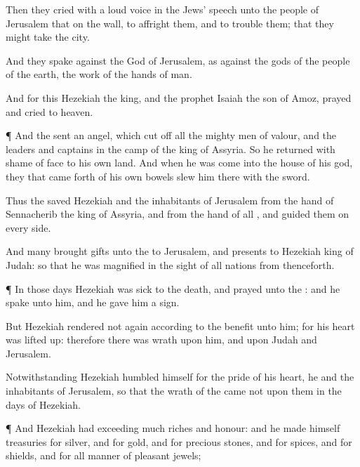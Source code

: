 {Then they
cried with a
loud
voice in the
Jews’ speech unto the
people of
Jerusalem that
{} on the
wall, to
affright them, and to
trouble them; that they might
take the
city.

And they
spake
against the
God of
Jerusalem, as against the
gods of the
people of the
earth,
{} the
work of the
hands of
man.

And for this
{}
Hezekiah the
king, and the
prophet
Isaiah the
son of
Amoz,
prayed and
cried to
heaven.


\par }{\PP {}¶ And the
{}
sent an
angel, which cut
off all the mighty
men of
valour, and the
leaders and
captains in the
camp of the
king of
Assyria. So he
returned with
shame of
face to his own
land. And when he was
come into the
house of his
god, they that came
forth of his own
bowels
slew him there with the
sword.

Thus the
{}
saved
Hezekiah and the
inhabitants of
Jerusalem from the
hand of
Sennacherib the
king of
Assyria, and from the
hand of all
{}, and
guided them on every
side.

And
many
brought
gifts unto the
{} to
Jerusalem, and
presents to
Hezekiah
king of
Judah: so that he was
magnified in the
sight of all
nations from
thenceforth.


\par }{\PP {}¶ In those
days
Hezekiah was
sick to the
death, and
prayed unto the
{}: and he
spake unto him, and he
gave him a
sign.

But
Hezekiah rendered not
again according to the
benefit
{} unto him; for his
heart was lifted
up: therefore there was
wrath upon him, and upon
Judah and
Jerusalem.

Notwithstanding
Hezekiah
humbled himself for the
pride of his
heart,
{} he and the
inhabitants of
Jerusalem, so that the
wrath of the
{}
came not upon them in the
days of
Hezekiah.


\par }{\PP {}¶ And
Hezekiah had
exceeding
much
riches and
honour: and he
made himself
treasuries for
silver, and for
gold, and for
precious
stones, and for
spices, and for
shields, and for all manner of
pleasant
jewels;

}
